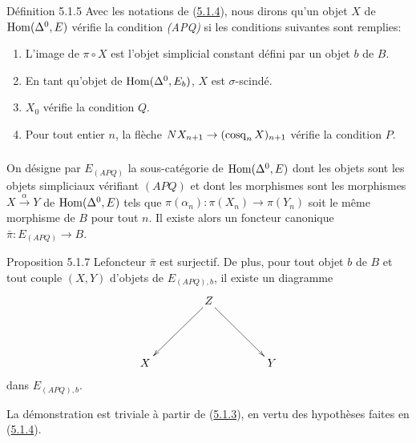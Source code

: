 \documentclass[10pt]{../fichiers-configuration-latex/smfart}
\begin{document}
\begin{enonce*}{Définition 5.1.5}
Avec les notations de (\hyperref[Vbis.subsubsec5.1.4]{5.1.4}), nous dirons qu'un
objet $X$ de
$\operatorname{Hom}(\Delta^{0}, E)$ vérifie la condition \emph{(APQ)} si les
conditions suivantes sont remplies:
\begin{enumerate}
\item[(i)] L'image de $\pi \circ X$ est l'objet simplicial constant défini
  par un objet $b$ de $B$.

\item[(ii)] En tant qu'objet de $\operatorname{Hom}(\Delta^0, E_b)$, $X$ est
  $\sigma$-scindé.

\item[(iii)] $X_0$ vérifie la condition $Q$.

\item[(iv)] Pour tout entier $n$, la flèche $N X_{n+1} \to (\cosq_n
  X)_{n+1}$ vérifie la condition $P$.
\end{enumerate}
\end{enonce*}

\setcounter{subsubsection}{5}
\subsubsection{}
On désigne par $E_{(APQ)}$ la sous-catégorie de $\operatorname{Hom}(\Delta^0, E)$
dont les objets sont les objets simpliciaux vérifiant $(APQ)$ et dont
les morphismes sont les morphismes $X \xrightarrow{\alpha} Y$ de
$\operatorname{Hom}(\Delta^{0}, E)$ tels que $\pi(\alpha_n) : \pi(X_n) \to
\pi(Y_n)$ soit le même morphisme de $B$ pour tout $n$. Il existe alors
un foncteur canonique $\bar{\pi} : E_{(APQ)} \to B$.

\begin{enonce*}{Proposition 5.1.7}
Le\pageoriginale foncteur $\bar{\pi}$ est surjectif. De plus, pour
tout objet $b$ de
$B$ et tout couple $(X, Y)$ d'objets de $E_{(APQ), b}$, il existe un
diagramme
\[
\xymatrix@=1.5cm{
  & Z \ar[ld]\ar[rd]&\\
X &   & Y
}
\]
dans $E_{(APQ), b}$.
\end{enonce*}

La démonstration est triviale à partir de (\hyperref[Vbis.prop5.1.3]{5.1.3}), en vertu des
hypothèses faites en (\hyperref[Vbis.subsubsec5.1.4]{5.1.4}).
\end{document}
